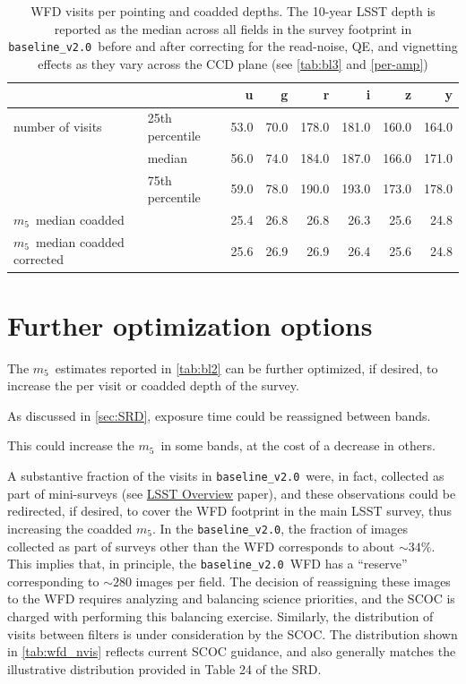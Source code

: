 \documentclass[PST,authoryear,toc]{lsstdoc}
\newcommand{\mf}{\ensuremath{m_5}}
\newcommand{\baseline}{\texttt{baseline\_v2.0}}
\begin{document}
\begin{table}[h!]
\caption{WFD visits per pointing and coadded  depths. The 10-year LSST depth is reported as the median across all fields in the survey footprint in \baseline\ before and after correcting for the read-noise, QE, and vignetting effects as they vary across the CCD plane (see \autoref{tab:bl3} and  \autoref{per-amp})}\label{tab:wfd_nvis}
    \centering
\begin{tabular}{llrrrrrr}
\hline
{} & &    u &     g &      r &      i &      z &      y \\
\hline
number of visits &25th percentile &  53.0 &  70.0 &  178.0 &  181.0 &  160.0 &  164.0 \\
&   median       &  56.0 &  74.0 &  184.0 &  187.0 &  166.0 &  171.0 \\
& 75th percentile &  59.0 &  78.0 &  190.0 &  193.0 &  173.0 &  178.0 \\
\hline
\mf\ median coadded &         &  25.4 &  26.8 &   26.8 &   26.3 &   25.6 &   24.8 \\
\hline
\mf\ median coadded corrected&         &  25.6 &  26.9 &   26.9 &   26.4 &   25.6 &   24.8 \\
\end{tabular}
\end{table}

\FloatBarrier


 
\section{Further optimization options}

The \mf\ estimates reported in \autoref{tab:bl2} can be further optimized, if desired, to increase the per visit or coadded depth of the survey. 

 
  
 As discussed in \autoref{sec:SRD}, exposure time could be reassigned between
bands. 

This could increase the \mf\ in some bands, at the cost of a decrease in others.
 
 A substantive fraction of the visits in \baseline\ were, in fact, collected as part of mini-surveys (see  \href{https://ls.st/lop}{{LSST Overview}} paper), and these observations could be redirected, if desired, to cover the WFD footprint in the main LSST survey, thus increasing the coadded \mf. In the \baseline, the fraction of images collected as part of surveys other than the WFD corresponds to about  $\sim34\%$. This implies that, in principle, the \baseline\ WFD has a ``reserve'' corresponding to $\sim280$ images per field.  The decision of reassigning these images to the WFD requires analyzing and balancing  science priorities, and the SCOC is charged with performing this balancing exercise. Similarly, the distribution of visits between filters is under consideration by the SCOC.  The distribution shown in \autoref{tab:wfd_nvis} reflects current SCOC guidance, and also generally matches the illustrative distribution provided in Table 24 of the SRD. 
\end{document}
